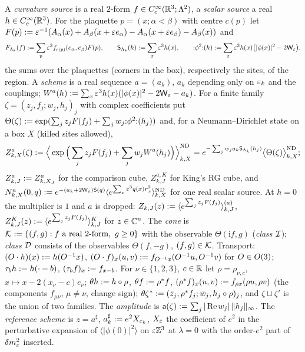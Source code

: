 \begin{definition}\label{def:s02:sources}
A \emph{curvature source} is a real $2$-form $f\in C^\infty_c(\mathbb R^3;\Lambda^2)$, a \emph{scalar source} a real $h\in C^\infty_c(\mathbb R^3)$. For the plaquette $p=(x;\alpha<\beta)$ with centre $c(p)$ let $F(p):=\varepsilon^{-1}(A_\alpha(x)+A_\beta(x+\varepsilon e_\alpha)-A_\alpha(x+\varepsilon e_\beta)-A_\beta(x))$ and
\[
F_{\Lambda_k}(f):=\sum_p\varepsilon^3f_{c(p)}(e_\alpha,e_\beta)F(p),\qquad
\mathsf S_{\Lambda_k}(h):=\sum_x\varepsilon^3h(x),\qquad
{:}\phi^2{:}(h):=\sum_x\varepsilon^3h(x)\big(|\phi(x)|^2-2\mathsf W_{\varepsilon}\big),
\]
the sums over the plaquettes (corners in the box), respectively the sites, of the region. A \emph{scheme} is a real sequence $a=(a_k)$, $a_k$ depending only on $\varepsilon_k$ and the couplings; $W^a(h):=\sum_x\varepsilon^3h(x)(|\phi(x)|^2-2\mathsf W_{\varepsilon}-a_k)$. For a finite family $\zeta=(z_j,f_j;w_j,h_j)_j$ with complex coefficients put $\Theta(\zeta):=\exp(\sum_jz_jF(f_j)+\sum_jw_j{:}\phi^2{:}(h_j))$ and, for a Neumann--Dirichlet state on a box $X$ (killed sites allowed),
\[
Z^a_{k,X}(\zeta):=\Big\langle\exp\Big(\sum_jz_jF(f_j)+\sum_jw_jW^a(h_j)\Big)\Big\rangle^{\mathrm{ND}}_{k,X}
=e^{-\sum_jw_ja_k\mathsf S_{\Lambda_k}(h_j)}\big\langle\Theta(\zeta)\big\rangle^{\mathrm{ND}}_{k,X};
\]
$Z^a_{k,J}:= Z^a_{k,X_J}$ for the comparison cube, $Z^{a,K}_{k,J}$ for King's RG cube, and $N^a_{k,X}(0,q):= e^{-(a_k+2\mathsf W_{\varepsilon})\mathsf S(q)}\langle e^{\sum_x\varepsilon^3q(x)r_x^2}\rangle^{\mathrm{ND}}_{k,X}$ for one real scalar source. At $h=0$ the multiplier is $1$ and $a$ is dropped: $Z_{k,J}(z):=\langle e^{\sum_jz_jF(f_j)}\rangle^{(a)}_{k,J}$, $Z^K_{k,J}(z):=\langle e^{\sum_jz_jF(f_j)}\rangle^{K}_{k,J}$ for $z\in\mathbb C^n$. The \emph{cone} is $\cK\defeq\{(f,g):f\text{ a real $2$-form},\ g\ge0\}$ with the observable $\Theta(\mathrm if,g)$ (\emph{class $\mathcal I$}); \emph{class $\mathcal D$} consists of the observables $\Theta(f,-g)$, $(f,g)\in\mathcal K$. Transport: $(O\cdot h)(x):= h(O^{-1}x)$, $(O\cdot f)_x(u,v):= f_{O^{-1}x}(O^{-1}u,O^{-1}v)$ for $O\in O(3)$; $\tau_bh:= h(\cdot-b)$, $(\tau_bf)_x:= f_{x-b}$. For $\nu\in\{1,2,3\}$, $c\in\mathbb R$ let $\rho=\rho_{\nu,c}$, $x\mapsto x-2(x_\nu-c)e_\nu$; $\theta h:= h\circ\rho$, $\theta f:=\rho^*f$, $(\rho^*f)_x(u,v):= f_{\rho x}(\rho u,\rho v)$ (the components $f_{\mu\nu}$, $\mu\ne\nu$, change sign); $\theta\zeta^*:=(\bar z_j,\rho^*f_j;\bar w_j,h_j\circ\rho)_j$, and $\zeta\sqcup\zeta'$ is the union of two families. The \emph{amplitude} is $\mathsf a(\zeta):=\sum_j|\operatorname{Re} w_j|\,\lVert h_j\rVert_\infty$. The \emph{reference scheme} is $z=a^\sharp$, $a^\sharp_k:= e^2X_{\varepsilon_k}$, $X_{\varepsilon}$ the coefficient of $e^2$ in the perturbative expansion of $\langle|\phi(0)|^2\rangle$ on $\varepsilon\mathbb Z^3$ at $\lambda=0$ with the order-$e^2$ part of $\delta m^2_{\varepsilon}$ inserted.
\end{definition}

